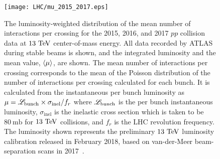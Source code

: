 \begin{figure}
 \centering
 \texttt{[image: LHC/mu\_2015\_2017.eps]}
 \caption[The luminosity-weighted distribution of the mean number of interactions per crossing for the 2015, 2016, and 2017 $pp$ collision data at $13~\TeV$ center-of-mass energy.]{%
  The luminosity-weighted distribution of the mean number of interactions per crossing for the 2015, 2016, and 2017 $pp$ collision data at $13~\TeV$ center-of-mass energy.
  All data recorded by ATLAS during stable beams is shown, and the integrated luminosity and the mean value, $\braket{\mu}$, are shown.
  The mean number of interactions per crossing corresponds to the mean of the Poisson distribution of the number of interactions per crossing calculated for each bunch.
  It is calculated from the instantaneous per bunch luminosity as $\mu = \mathscr{L}_{\mathrm{bunch}} \times \sigma_{\mathrm{inel}} / f_{r}$ where $\mathscr{L}_{\mathrm{bunch}}$ is the per bunch instantaneous luminosity, $\sigma_{\mathrm{inel}}$ is the inelastic cross section which is taken to be $80~\mathrm{mb}$ for $13~\TeV$ collisions, and $f_{r}$ is the LHC revolution frequency.
  The luminosity shown represents the preliminary $13~\TeV$ luminosity calibration released in February 2018, based on van-der-Meer beam-separation scans in 2017~\cite{ATLAS:pileup_2015_2017}.}
 \label{fig:mu_2015_2017}
\end{figure}

